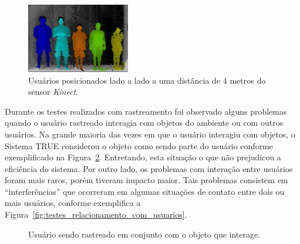 	\begin{figure}[htb]
		\begin{center}
			\includegraphics[width=0.4\textwidth]{figuras/5.Testes/oclusao/max-pessoas.png}
		\end{center}
		\caption{Usuários posicionados lado a lado a uma distância de 4 metros do
		sensor \textit{Kinect}.}
		\label{fig:max-pessoas}
	\end{figure}
		
	Durante os testes realizados com rastreamento foi observado alguns problemas
	quando o usuário rastreado interagia com objetos do ambiente ou com outros
	usuários. Na grande maioria das vezes em que o usuário interagiu com objetos, o
	Sistema TRUE considerou o objeto como sendo parte do usuário conforme
	exemplificado na Figura~\ref{fig:testes_relacionamento_com_objetos}. Entretando,
	esta situação o que não prejudicou a eficiência do sistema. Por outro lado, os
	problemas com interação entre usuários foram mais raros, porém tiveram impacto
	maior. Tais problemas consistem em ``interferências'' que ocorreram em algumas
	situações de contato entre dois ou mais usuários, conforme exemplifica a
	Figura~\ref{fig:testes_relacionamento_com_usuarios}.
	
	\begin{figure}[htb]
		\begin{center}
		\end{center}
		\caption{Usuário sendo rastreado em conjunto com o objeto que interage.}
		\label{fig:testes_relacionamento_com_objetos}
	\end{figure}
		
